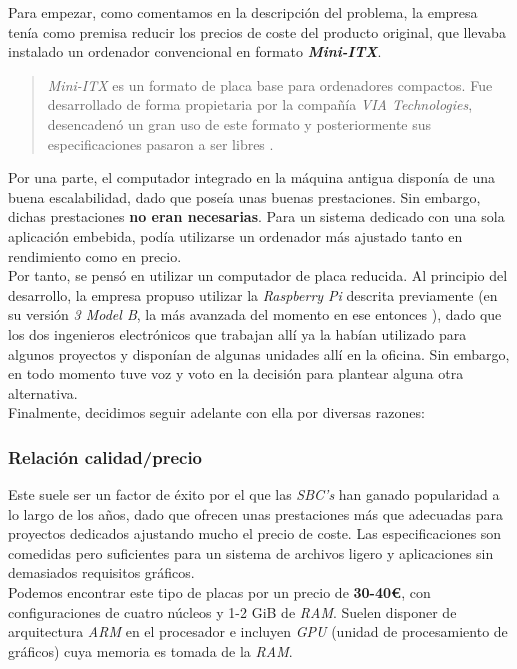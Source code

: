 Para empezar, como comentamos en la descripción del problema, la empresa tenía como premisa reducir los precios de coste del producto original, que llevaba instalado un ordenador convencional en formato \textbf{\textit{Mini-ITX}}.

\begin{quotation}
	\textit{Mini-ITX} es un formato de placa base para ordenadores compactos. Fue desarrollado de forma propietaria por la compañía \textit{VIA Technologies}, desencadenó un gran uso de este formato y posteriormente sus especificaciones pasaron a ser libres \cite{via-mini-itx}.
\end{quotation}

Por una parte, el computador integrado en la máquina antigua disponía de una buena escalabilidad, dado que poseía unas buenas prestaciones. Sin embargo, dichas prestaciones \textbf{no eran necesarias}. Para un sistema dedicado con una sola aplicación embebida, podía utilizarse un ordenador más ajustado tanto en rendimiento como en precio.\\

Por tanto, se pensó en utilizar un computador de placa reducida. Al principio del desarrollo, la empresa propuso utilizar la \textit{Raspberry Pi} descrita previamente (en su versión \textit{3 Model B}, la más avanzada del momento en ese entonces \cite{raspberry-pi-3-model-b}), dado que los dos ingenieros electrónicos que trabajan allí ya la habían utilizado para algunos proyectos y disponían de algunas unidades allí en la oficina. Sin embargo, en todo momento tuve voz y voto en la decisión para plantear alguna otra alternativa.\\

Finalmente, decidimos seguir adelante con ella por diversas razones:

\subsubsection{Relación calidad/precio}

Este suele ser un factor de éxito por el que las \textit{SBC's} han ganado popularidad a lo largo de los años, dado que ofrecen unas prestaciones más que adecuadas para proyectos dedicados ajustando mucho el precio de coste. Las especificaciones son comedidas pero suficientes para un sistema de archivos ligero y aplicaciones sin demasiados requisitos gráficos.\\

Podemos encontrar este tipo de placas por un precio de \textbf{30-40€}, con configuraciones de cuatro núcleos y 1-2 GiB de \textit{RAM}. Suelen disponer de arquitectura \textit{ARM} en el procesador e incluyen \textit{GPU} (unidad de procesamiento de gráficos) cuya memoria es tomada de la \textit{RAM}.\\

